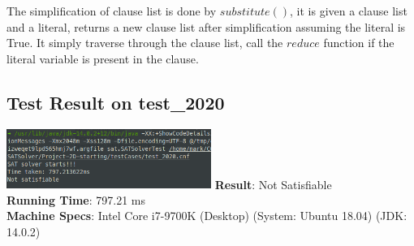 \documentclass[a4paper,12pt]{article}
\begin{document}
\begin{multicols}{2}
The simplification of clause list is done by $substitute()$, it is given a clause list 
and a literal, returns a new clause list after simplification assuming the literal is True.
It simply traverse through the clause list, call the $reduce$ function 
if the literal variable is present in the clause.

\subsection*{Test Result on test\_2020}
\includegraphics[width=0.5\textwidth]{result.png}
\textbf{Result}: Not Satisfiable \\
\textbf{Running Time}: 797.21 ms \\
\textbf{Machine Specs}: Intel Core i7-9700K (Desktop) (System: Ubuntu 18.04) (JDK: 14.0.2)\\

\end{multicols}
\end{document}
